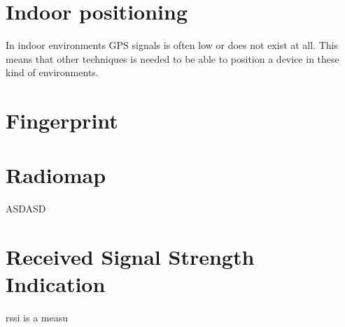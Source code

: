 \section{Indoor positioning}
In indoor environments GPS signals is often low or does not exist at all.
This means that other techniques is needed to be able to position a device in these kind of environments.
\section{Fingerprint}
\section{Radiomap}
ASDASD
\section{Received Signal Strength Indication}
\acrfull{rssi} is a measu 
